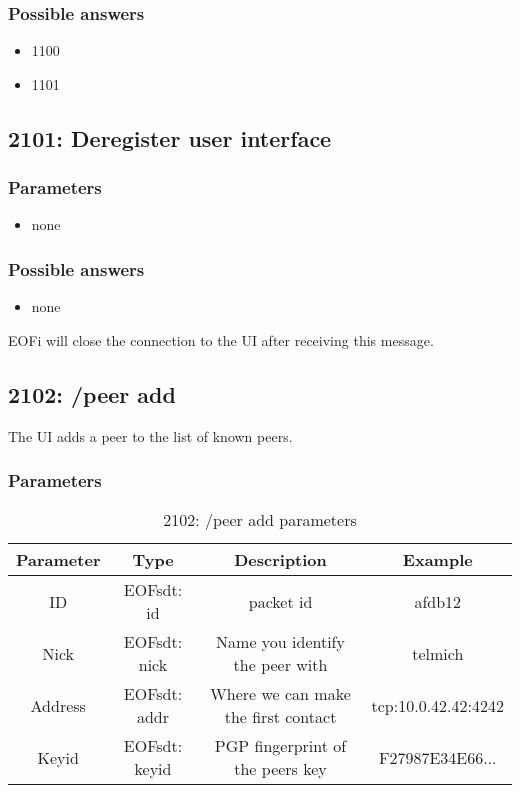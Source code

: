 \documentclass[12pt,a4paper]{book}
\begin{document}
\subsubsection{Possible answers}
\begin{itemize}
\item 1100
\item 1101
\end{itemize}
\subsection{2101: Deregister user interface}

\subsubsection{Parameters}
\begin{itemize}
\item none
\end{itemize}

\subsubsection{Possible answers}
\begin{itemize}
\item none
\end{itemize}

EOFi will close the connection to the UI after receiving this message.

\subsection{2102: /peer add}
The UI adds a peer to the list of known peers.

\subsubsection{Parameters}
%
\begin{longtable}{|c|c|c|c|}
\caption{2102: /peer add parameters}\\
\hline
\textbf{Parameter} & \textbf{Type} & \textbf{Description} & \textbf{Example}\\
\hline
ID & EOFsdt: id & packet id & afdb12\\
\hline
Nick & EOFsdt: nick & Name you identify the peer with & telmich\\
\hline
Address & EOFsdt: addr & Where we can make the first contact & tcp:10.0.42.42:4242\\
\hline
Keyid & EOFsdt: keyid & PGP fingerprint of the peers key & F27987E34E66...\\
\hline
\end{longtable}
\end{document}
